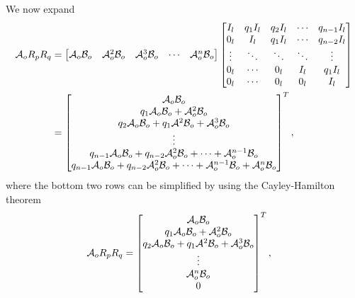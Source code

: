 \begin{appendices}
We now expand
\begin{equation*}
    \begin{split}
        \mathcal{A}_oR_pR_q &= 
        \begin{bmatrix}
            \mathcal{A}_o\mathcal{B}_o & \mathcal{A}^2_o\mathcal{B}_o & \mathcal{A}^{3}_o\mathcal{B}_o & \cdots & \mathcal{A}^{n}_o\mathcal{B}_o \\
        \end{bmatrix}
        \begin{bmatrix}
            I_l & q_1I_l & q_2I_l & \cdots & q_{n-1}I_l \\
            0_l & I_l & q_1I_l & \cdots & q_{n-2}I_l \\
            \vdots & \ddots & \ddots & \ddots & \vdots \\
            0_l & \cdots & 0_l & I_l & q_1I_l \\
            0_l & \cdots & 0_l & 0_l & I_l \\
        \end{bmatrix} \\
        &=
        \begin{bmatrix}
            \mathcal{A}_o\mathcal{B}_o \\ 
            q_1\mathcal{A}_o\mathcal{B}_o + \mathcal{A}^2_o\mathcal{B}_o \\ 
            q_2\mathcal{A}_o\mathcal{B}_o + q_1\mathcal{A}^2\mathcal{B}_o + \mathcal{A}^3_o\mathcal{B}_o \\ \vdots \\ 
            q_{n-1}\mathcal{A}_o\mathcal{B}_o + q_{n-2}\mathcal{A}^2_o\mathcal{B}_o + \cdots + \mathcal{A}^{n-1}_o\mathcal{B}_o \\
            q_{n-1}\mathcal{A}_o\mathcal{B}_o + q_{n-2}\mathcal{A}^2_o\mathcal{B}_o + \cdots + \mathcal{A}^{n-1}_o\mathcal{B}_o + \mathcal{A}^n_o\mathcal{B}_o \\
        \end{bmatrix}^T,
    \end{split}
\end{equation*}
where the bottom two rows can be simplified by using the Cayley-Hamilton theorem
\begin{equation*}
    \begin{split}
        \A_oR_pR_q &= 
        \begin{bmatrix}
            \A_o\B_o \\ 
            q_1\A_o\B_o + \A^2_o\B_o \\ 
            q_2\A_o\B_o + q_1\A^2\B_o + \A^3_o\B_o \\ \vdots \\ 
            \A^{n}_o\B_o \\
            0 \\
        \end{bmatrix}^T,
    \end{split}

\end{equation*}
\end{appendices}
